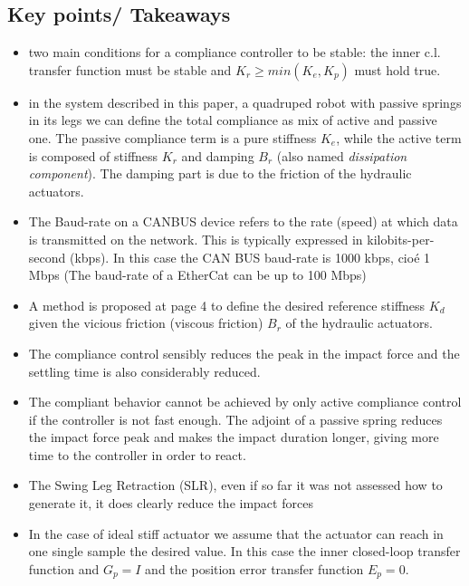 \subsection*{Key points/ Takeaways}
\begin{itemize}
\item two main conditions for a compliance controller to be stable: the inner c.l. transfer function must be stable and  $K_r \geq min(K_e, K_p)$ must hold true.
\item in the system described in this paper, a quadruped robot with passive springs in its legs we can define the total compliance as mix of active and passive one. The passive compliance term is a pure stiffness $K_e$, while the active term is composed of stiffness $K_r$ and damping $B_r$ (also named \textit{dissipation component}). The damping part is due to the friction of the hydraulic actuators.
\item The Baud-rate on a CANBUS device refers to the rate (speed) at which data is transmitted on the network. This is typically expressed in kilobits-per-second (kbps). In this case the CAN BUS baud-rate is 1000 kbps, cio\'e 1 Mbps (The baud-rate of a EtherCat can be up to 100 Mbps)
\item A method is proposed at page 4 to define the desired reference stiffness $K_d$ given the vicious friction (viscous friction) $B_r$ of the hydraulic actuators.
\item The compliance control sensibly reduces the peak in the impact force and the settling time is also considerably reduced.
\item The compliant behavior cannot be achieved by only active compliance control if the controller is not fast enough. The adjoint of a passive spring reduces the impact force peak and makes the impact duration longer, giving more time to the controller in order to react.
\item The Swing Leg Retraction (SLR), even if so far it was not assessed how to generate it, it does clearly reduce the impact forces
\item In the case of ideal stiff actuator we assume that the actuator can reach in one single sample the desired value. In this case the inner closed-loop transfer function and $G_p = I$ and the position error transfer function $E_p = 0$.
\end{itemize}

